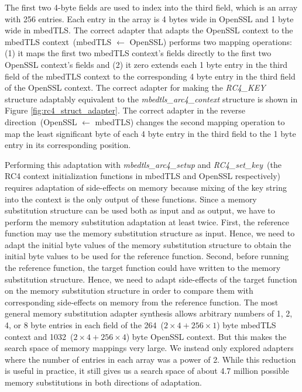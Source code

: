 %
The first two 4-byte fields are used to index into the third field, which is an array with 256 entries.
%
Each entry in the array is 4 bytes wide in OpenSSL and 1 byte wide in mbedTLS.
%
The correct adapter that adapts the OpenSSL context to the mbedTLS
context~(mbedTLS $\leftarrow$ OpenSSL) performs two mapping operations:
(1) it maps the first two mbedTLS context\rq s fields directly to the
first two OpenSSL context\rq s fields and (2) it zero extends each 1 byte
entry in the third field of the mbedTLS context to the corresponding 4
byte entry in the third field of the OpenSSL context.
%
The correct adapter for making the \textit{RC4\_KEY} structure adaptably
equivalent to the \textit{mbedtls\_arc4\_context} structure is shown in Figure \ref{fig:rc4_struct_adapter}.
%
The correct adapter in the reverse direction~(OpenSSL $\leftarrow$ mbedTLS) changes the second mapping operation to map the least significant byte of each 4 byte entry in the third field to the 1 byte entry in its corresponding position.

Performing this adaptation with \textit{mbedtls\_arc4\_setup} and
\textit{RC4\_set\_key}~(the RC4 context initialization functions in
mbedTLS and OpenSSL respectively) requires adaptation of side-effects on memory
because mixing of the key string into the context is the only output of these functions.
%
Since a memory substitution structure can be used both as input and as output, we have to perform the memory substitution adaptation at least twice.
%
First, the reference function may use the memory substitution structure as input.
Hence, we need to adapt the initial byte values of the memory substitution structure to obtain the initial byte values to be used for the reference function.
%
Second, before running the reference function, the target function could have written to the memory substitution structure.
Hence, we need to adapt side-effects of the target function on the memory substitution structure in order to compare them with corresponding side-effects on memory from the reference function.
%
The most general memory substitution adapter synthesis allows arbitrary
numbers of 1, 2, 4, or 8 byte entries in each field of the
264~($2 \times 4 + 256 \times 1$) byte mbedTLS context and 1032~($2 \times 4+256 \times 4$) byte OpenSSL
context.
%
But this makes the search space of memory mappings very large.
%
We instead only explored adapters where the number of entries in each array was a power of 2.
%
While this reduction is useful in practice, it still gives us a search space of about 4.7 million possible memory substitutions in both directions of adaptation.

